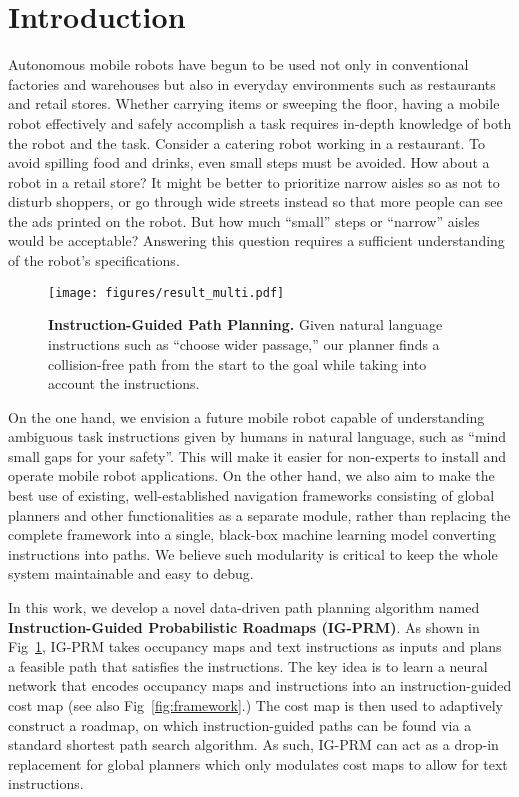 
\section{Introduction}
Autonomous mobile robots have begun to be used not only in conventional factories and warehouses but also in everyday environments such as restaurants and retail stores. Whether carrying items or sweeping the floor, having a mobile robot effectively and safely accomplish a task requires in-depth knowledge of both the robot and the task. Consider a catering robot working in a restaurant. To avoid spilling food and drinks, even small steps must be avoided. How about a robot in a retail store? It might be better to prioritize narrow aisles so as not to disturb shoppers, or go through wide streets instead so that more people can see the ads printed on the robot. But how much ``small'' steps or ``narrow'' aisles would be acceptable? Answering this question requires a sufficient understanding of the robot's specifications.

\begin{figure}[t]
    \centering
    \texttt{[image: figures/result\_multi.pdf]}
    \caption{\textbf{Instruction-Guided Path Planning.} Given natural language instructions such as ``choose wider passage,'' our planner finds a collision-free path from the start to the goal while taking into account the instructions.}
    \label{fig:teaser}
\end{figure}

On the one hand, we envision a future mobile robot capable of understanding ambiguous task instructions given by humans in natural language, such as ``mind small gaps for your safety''. This will make it easier for non-experts to install and operate mobile robot applications. On the other hand, we also aim to make the best use of existing, well-established navigation frameworks consisting of global planners and other functionalities as a separate module, rather than replacing the complete framework into a single, black-box machine learning model converting instructions into paths. We believe such modularity is critical to keep the whole system maintainable and easy to debug.


In this work, we develop a novel data-driven path planning algorithm named \textbf{Instruction-Guided Probabilistic Roadmaps (IG-PRM)}. As shown in Fig~\ref{fig:teaser}, IG-PRM takes occupancy maps and text instructions as inputs and plans a feasible path that satisfies the instructions. The key idea is to learn a neural network that encodes occupancy maps and instructions into an instruction-guided cost map (see also Fig~\ref{fig:framework}.) The cost map is then used to adaptively construct a roadmap, on which instruction-guided paths can be found via a standard shortest path search algorithm. As such, IG-PRM can act as a drop-in replacement for global planners which only modulates cost maps to allow for text instructions.

